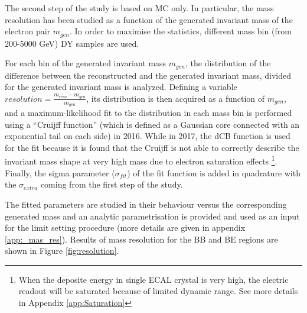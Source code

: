 The second step of the study is based on MC only.
In particular, the mass resolution has been studied as a function of the generated invariant mass of the electron pair $m_{gen}$.
In order to maximise the statistics, different mass bin (from 200-5000 GeV) DY samples are used.

For each bin of the generated invariant mass $m_{gen}$, the distribution of the difference between the reconstructed and the generated invariant mass,
divided for the generated invariant mass is analyzed.
Defining a variable $resolution =\frac{m_{reco}-m_{gen}}{m_{gen}}$, its distribution is then acquired as a function of $m_{gen}$, and a maximum-likelihood
fit to the distribution in each mass bin is performed using a ``Cruijff function'' (which is defined as a Gaussian core connected with an exponential tail on each side) in 2016. While in 2017, the dCB function is used for the fit because it is found that the Cruijff is not able to correctly describe the invariant mass shape at very high mass due to electron saturation effects \footnote{When the deposite energy in single ECAL crystal is very high, the electric readout will be saturated because of limited dynamic range. See more details in Appendix \ref{app:Saturation}}.
Finally, the sigma parameter ($\sigma_{fit}$) of the fit function is added in quadrature with the $\sigma_{extra}$ coming from the first step of the study.

The fitted parameters are studied in their behaviour versus the corresponding generated mass and an analytic parametrisation is provided and used
as an input for the limit setting procedure (more details are given in appendix \ref{app:_mas_res}).
Results of mass resolution for the BB and BE regions are shown in Figure \ref{fig:resolution}.

